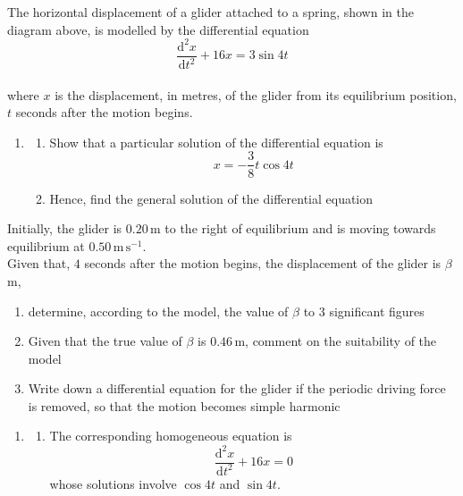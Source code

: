 \documentclass[leqno]{article}
\begin{document}
\begin{enumerate}[
  label=\textbf{\arabic*.},
  leftmargin=*,
  topsep=0pt,
  partopsep=0pt,
  parsep=0pt
]
The horizontal displacement of a glider attached to a spring, shown in the diagram above, is modelled by the differential equation \\
\[\frac{\mathrm{d}^2 x}{\mathrm{d} t^2}+16x=3\sin 4t\] \\
where $x$ is the displacement, in metres, of the glider from its equilibrium position, $t$ seconds after the motion begins. \\
\begin{enumerate}[label=\textbf{(\alph*)}]
  \item
  \begin{enumerate}[label=(\roman*)]
    \item Show that a particular solution of the differential equation is
    \[
    x=-\frac{3}{8} t \cos 4t
    \] 
    \item Hence, find the general solution of the differential equation  \\
  \end{enumerate}
\end{enumerate}
Initially, the glider is $0.20\,\mathrm{m}$ to the right of equilibrium and is moving towards equilibrium at $0.50\,\mathrm{m\,s^{-1}}$. \\
Given that, $4$ seconds after the motion begins, the displacement of the glider is $\beta$ m, \\
\begin{enumerate}[label=\textbf{(\alph*)}, resume]
  \item determine, according to the model, the value of $\beta$ to $3$ significant figures  \\
  \item Given that the true value of $\beta$ is $0.46\,\mathrm{m}$, comment on the suitability of the model  \\
  \item Write down a differential equation for the glider if the periodic driving force is removed, so that the motion becomes simple harmonic  \\
\end{enumerate}

\vspace*{30pt}

\begin{tcolorbox}[colback=white, colframe=scarlet, title={\textbf{Solution}}, breakable, grow to left by=6mm, grow to right by=10mm]
\begin{enumerate}[label=\textbf{(\alph*)}]
  \item
  \begin{enumerate}[label=(\roman*)]
    \item The corresponding homogeneous equation is
    \[
    \frac{\mathrm{d}^2x}{\mathrm{d}t^2}+16x=0
    \]
    whose solutions involve $\cos 4t$ and $\sin 4t$.


\end{enumerate}
\end{enumerate}
\end{tcolorbox}
\end{enumerate}
\end{document}
